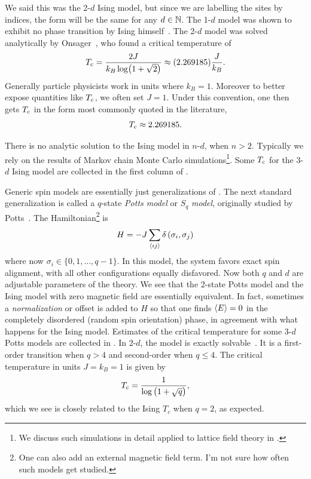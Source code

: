We said this was the 2-$d$
Ising model, but since we are labelling the sites by indices, the form
will be the same for any $d\in\mathbb{N}$. The 1-$d$ model was shown to
exhibit no phase transition by Ising himself~\cite{ising_beitrag_1924}.
The 2-$d$ model was solved analytically by 
Onsager~\cite{onsager_crystal_1944}, who found a critical temperature of
\begin{equation}
T_{\rm c}=\frac{2 J}{k_B \log (1+\sqrt{2})}\approx(2.269185) \frac{J}{k_B}.
\end{equation}
Generally particle physicists work in units where $k_B=1$. Moreover
to better expose quantities like $T_{\rm c}$, we often set $J=1$. Under this
convention, one then gets $T_{\rm c}$ in the form most commonly quoted
in the literature,
\begin{equation}
T_{\rm c}\approx2.269185.
\end{equation}

There is no analytic solution to the Ising model in $n$-$d$, when $n>2$.
Typically we rely on the results of Markov chain Monte Carlo
simulations\footnote{We discuss such simulations in detail applied to lattice
field theory in .}. Some $T_{\rm c}$ for the 3-$d$
Ising model are collected in the first column of
. 

Generic spin models are essentially just generalizations of .
The next standard generalization is called a $q$-state
{\it Potts model} or
$S_q$ {\it model}, originally studied by 
Potts~\cite{Potts:1951rk}. The Hamiltonian\footnote{One can also add 
an external magnetic field term. I'm not sure how often such
models get studied.} is
\begin{equation}\label{eq:potts}
H=-J\sum_{\ev{i j}} \delta\left(\sigma_i, \sigma_j\right)
\end{equation}
where now $\sigma_i\in\{0,1,...,q-1\}$. In this
model, the system favors exact spin alignment, with all other configurations
equally disfavored. Now both $q$ and $d$ are adjustable parameters of the
theory. We see that the 2-state Potts model and the Ising model with
zero magnetic field are essentially equivalent. In fact, sometimes a
{\it normalization} or offset is added to $H$
so that one finds $\ev{E}=0$ in the completely disordered
(random spin orientation) phase, in agreement
with what happens for the Ising model.
Estimates of the critical temperature for some 3-$d$ Potts
models are collected in .
In 2-$d$, the model is exactly 
solvable~\cite{baxter_exactly_1982}. It is a first-order
transition when $q>4$ and second-order when $q\leq4$.
The critical temperature in units $J=k_B=1$ is given by
\begin{equation}
T_{\rm c}=\frac{1}{\log\left(1+\sqrt{q}\right)},
\end{equation}
which we see is closely related to the Ising $T_c$ when $q=2$, as expected.

